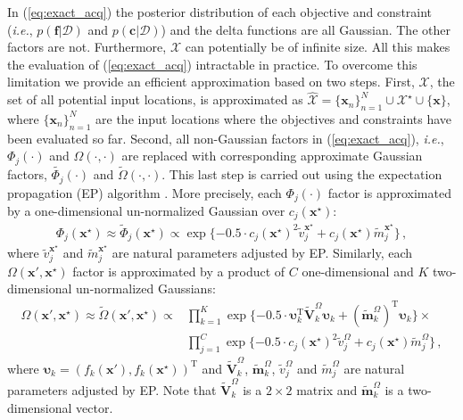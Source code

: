 \documentclass[review,preprint,12pt]{elsarticle}
\providecommand{\DIFaddtex}[1]{{\protect\color{blue}\uwave{#1}}} %
\providecommand{\DIFdeltex}[1]{{\protect\color{red}\sout{#1}}}                      %
\providecommand{\DIFaddbegin}{} %
\providecommand{\DIFaddend}{} %
\providecommand{\DIFdelbegin}{} %
\providecommand{\DIFdelend}{} %
\providecommand{\DIFadd}[1]{\texorpdfstring{\DIFaddtex{#1}}{#1}} %
\providecommand{\DIFdel}[1]{\texorpdfstring{\DIFdeltex{#1}}{}} %
\begin{document}
In (\ref{eq:exact_acq}) the posterior distribution of each objective  and constraint (\emph{i.e.}, 
$p(\textbf{f}|\mathcal{D})$ and $p(\textbf{c}|\mathcal{D})$) and the delta functions are all Gaussian. 
The other factors are not. Furthermore, $\mathcal{X}$ can potentially be of 
infinite size. All this makes the evaluation of (\ref{eq:exact_acq}) intractable in 
practice. To overcome this limitation we provide an efficient approximation based 
on two steps. First, $\mathcal{X}$, the set of all potential input locations, is approximated as
$\hat{\mathcal{X}} = \{\textbf{x}_n\}_{n=1}^{N} \cup \mathcal{X}^{\star} \cup \{\textbf{x}\}$, 
where $\{\textbf{x}_n\}_{n=1}^{N}$ are the input locations where the objectives and constraints 
have been evaluated so far. Second, all non-Gaussian factors in (\ref{eq:exact_acq}), 
\emph{i.e.}, $\Phi_j(\cdot)$ and $\Omega(\cdot, \cdot)$ are replaced with corresponding approximate 
Gaussian factors, \DIFdelbegin \DIFdel{$\tilde{\Phi_j}(\cdot)$ }\DIFdelend \DIFaddbegin \DIFadd{$\tilde{\Phi}_j(\cdot)$ }\DIFaddend and $\tilde{\Omega}(\cdot, \cdot)$. This last step is 
carried out using the expectation propagation (EP) algorithm \citep{minka2001expectation}. 
More precisely, each $\Phi_j(\cdot)$ factor is approximated by a one-dimensional un-normalized 
Gaussian over $c_j(\mathbf{x}^\star)$: 
\begin{align}
\Phi_j(\mathbf{x}^\star) \approx \tilde{\Phi}_j(\mathbf{x}^\star) \propto
	\exp\{-0.5 \cdot c_j(\mathbf{x}^\star)^2\tilde{v}_j^{\mathbf{x}^\star} + 
	c_j(\mathbf{x}^\star) \tilde{m}_j^{\mathbf{x}^\star}\}\,,
\end{align}
where $\tilde{v}_j^{\mathbf{x}^\star}$ and $\tilde{m}_j^{\mathbf{x}^\star}$ are natural parameters
adjusted by EP.
Similarly, each $\Omega(\mathbf{x}',\mathbf{x}^\star)$ factor is approximated by a product of $C$ 
one-dimensional and $K$ two-dimensional un-normalized Gaussians:
\begin{align}
\Omega(\mathbf{x}',\mathbf{x}^\star) \approx
\tilde{\Omega}(\mathbf{x}',\mathbf{x}^\star)  \propto &
\prod_{k=1}^K \exp \{-0.5 \cdot \bm{\upsilon}_k^\text{T} \tilde{\mathbf{V}}_k^{\Omega} 
	\bm{\upsilon}_k + (\tilde{\mathbf{m}}_k^{\Omega})^\text{T} \bm{\upsilon}_k \} \times \nonumber \\
	& \prod_{j=1}^C 
	\exp\{-0.5 \cdot c_j(\mathbf{x}^\star)^2\tilde{v}_j^{\Omega} + c_j(\mathbf{x}^\star) \tilde{m}_j^{\Omega}\}
\,,
\end{align}
where $\bm{\upsilon}_k=(f_k(\mathbf{x}'),f_k(\mathbf{x}^\star))^\text{T}$ and 
$\tilde{\mathbf{V}}_k^{\Omega}$, $\tilde{\mathbf{m}}_k^{\Omega}$, 
$\tilde{v}_j^{\Omega}$ and $\tilde{m}_j^{\Omega}$ are 
natural parameters adjusted by EP. Note that $\tilde{\mathbf{V}}_k^{\Omega}$ is a $2 \times 2$ matrix and
$\tilde{\mathbf{m}}_k^{\Omega}$ is a two-dimensional vector.
\end{document}
